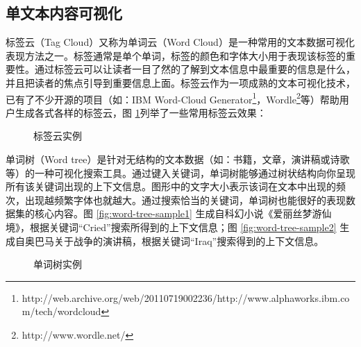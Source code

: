 \subsection{单文本内容可视化}
标签云（Tag Cloud）又称为单词云（Word Cloud）是一种常用的文本数据可视化表现方法之一。标签通常是单个单词，标签的颜色和字体大小用于表现该标签的重要性。通过标签云可以让读者一目了然的了解到文本信息中最重要的信息是什么，并且把读者的焦点引导到重要信息上面。标签云作为一项成熟的文本可视化技术，已有了不少开源的项目（如：IBM Word-Cloud Generator\footnote{http://web.archive.org/web/20110719002236/http://www.alphaworks.ibm.com/tech/wordcloud}，Wordle\footnote{http://www.wordle.net/}等）帮助用户生成各式各样的标签云，图 \ref{fig:tag-cloud}列举了一些常用标签云效果：
\begin{figure}[htb]
    \centering
    \caption{标签云实例}
    \label{fig:tag-cloud}
\end{figure}

单词树（Word tree）\cite{Wattenberg2008}是针对无结构的文本数据（如：书籍，文章，演讲稿或诗歌等）的一种可视化搜索工具。通过键入关键词，单词树能够通过树状结构向你呈现所有该关键词出现的上下文信息。图形中的文字大小表示该词在文本中出现的频次，出现越频繁字体也就越大。通过搜索恰当的关键词，单词树也能很好的表现数据集的核心内容。图 \ref{fig:word-tree-sample1} 生成自科幻小说《爱丽丝梦游仙境》，根据关键词“Cried”搜索所得到的上下文信息；图 \ref{fig:word-tree-sample2} 生成自奥巴马关于战争的演讲稿，根据关键词“Iraq”搜索得到的上下文信息。 
\begin{figure}[htb]
    \centering
    \caption{单词树实例}
    \label{fig:word-tree}
\end{figure}

